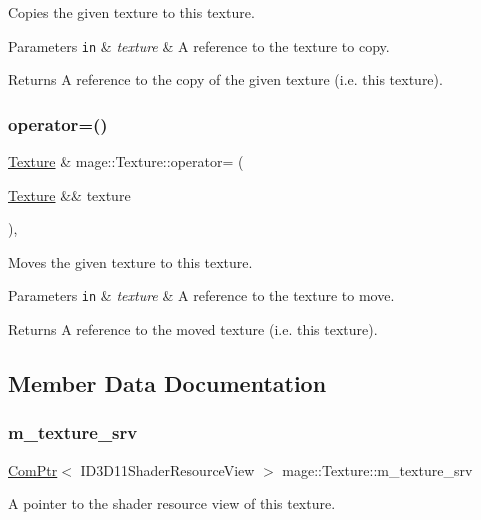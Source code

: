 Copies the given texture to this texture.


\begin{DoxyParams}[1]{Parameters}
\mbox{\tt in}  & {\em texture} & A reference to the texture to copy. \\
\hline
\end{DoxyParams}
\begin{DoxyReturn}{Returns}
A reference to the copy of the given texture (i.\+e. this texture). 
\end{DoxyReturn}
\hypertarget{classmage_1_1_texture_acb6194e969cc928f21ecef1d863d1b9b}{}\label{classmage_1_1_texture_acb6194e969cc928f21ecef1d863d1b9b} 
\subsubsection{\texorpdfstring{operator=()}{operator=()}\hspace{0.1cm}{\footnotesize\ttfamily [2/2]}}
{\footnotesize\ttfamily \hyperlink{classmage_1_1_texture}{Texture} \& mage\+::\+Texture\+::operator= (\begin{DoxyParamCaption}\item[{\hyperlink{classmage_1_1_texture}{Texture} \&\&}]{texture }\end{DoxyParamCaption})\hspace{0.3cm}{\ttfamily [default]}, {\ttfamily [noexcept]}}

Moves the given texture to this texture.


\begin{DoxyParams}[1]{Parameters}
\mbox{\tt in}  & {\em texture} & A reference to the texture to move. \\
\hline
\end{DoxyParams}
\begin{DoxyReturn}{Returns}
A reference to the moved texture (i.\+e. this texture). 
\end{DoxyReturn}


\subsection{Member Data Documentation}
\hypertarget{classmage_1_1_texture_a8666bb39618e89e782c7cfeabebcc2b0}{}\label{classmage_1_1_texture_a8666bb39618e89e782c7cfeabebcc2b0} 
\subsubsection{\texorpdfstring{m\+\_\+texture\+\_\+srv}{m\_texture\_srv}}
{\footnotesize\ttfamily \hyperlink{namespacemage_ae74f374780900893caa5555d1031fd79}{Com\+Ptr}$<$ I\+D3\+D11\+Shader\+Resource\+View $>$ mage\+::\+Texture\+::m\+\_\+texture\+\_\+srv\hspace{0.3cm}{\ttfamily [private]}}

A pointer to the shader resource view of this texture. 